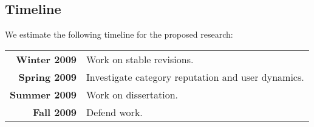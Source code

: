 \subsection{Timeline}

We estimate the following timeline for the proposed research:

\begin{tabular}{r p{}}
\textbf{Winter 2009} &
	Work on stable revisions. \\
\textbf{Spring 2009} &
	Investigate category reputation and user dynamics. \\
\textbf{Summer 2009} &
	Work on dissertation. \\
\textbf{Fall 2009} &
	Defend work. \\
\end{tabular}


